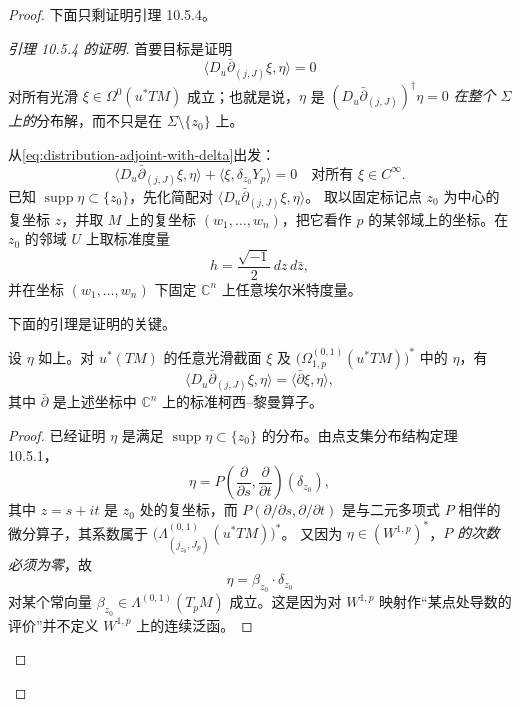 \begin{proof}
下面只剩证明引理 10.5.4。

\begin{proof}[引理 10.5.4 的证明]
首要目标是证明
\begin{equation}
 \langle D_u\bar\partial_{(j,J)}\xi,\eta\rangle=0
 \label{eq:global-distributional-adjoint-zero}
\end{equation}
对所有光滑 $\xi\in\Omega^0(u^*TM)$ 成立；也就是说，$\eta$ 是
$(D_u\bar\partial_{(j,J)})^\dagger\eta=0$ \emph{在整个 $\Sigma$ 上的}分布解，而不只是在
$\Sigma\setminus\{z_0\}$ 上。

从\eqref{eq:distribution-adjoint-with-delta}出发：
\begin{equation}
 \langle D_u\bar\partial_{(j,J)}\xi,\eta\rangle
 +\langle\xi,\delta_{z_0}Y_p\rangle=0
 \quad\text{对所有 }\xi\in C^\infty.
 \label{eq:distribution-adjoint-start}
\end{equation}
已知 $\operatorname{supp}\eta\subset\{z_0\}$，先化简配对
$\langle D_u\bar\partial_{(j,J)}\xi,\eta\rangle$。
取以固定标记点 $z_0$ 为中心的复坐标 $z$，并取 $M$ 上的复坐标
$(w_1,\ldots,w_n)$，把它看作 $p$ 的某邻域上的坐标。在 $z_0$ 的邻域
$U$ 上取标准度量
\[
 h=\frac{\sqrt{-1}}2\,dz\,d\bar z,
\]
并在坐标 $(w_1,\ldots,w_n)$ 下固定 $\mathbb C^n$ 上任意埃尔米特度量。

下面的引理是证明的关键。

\begin{lemma}\label{lem:local-standard-part-pairing}
设 $\eta$ 如上。对 $u^*(TM)$ 的任意光滑截面 $\xi$ 及
$\bigl(\Omega_{1,p}^{(0,1)}(u^*TM)\bigr)^*$ 中的 $\eta$，有
\[
 \langle D_u\bar\partial_{(j,J)}\xi,\eta\rangle
 =\langle\bar\partial\xi,\eta\rangle,
\]
其中 $\bar\partial$ 是上述坐标中 $\mathbb C^n$ 上的标准柯西--黎曼算子。
\end{lemma}

\begin{proof}
已经证明 $\eta$ 是满足
$\operatorname{supp}\eta\subset\{z_0\}$ 的分布。由点支集分布结构定理 10.5.1，
\[
 \eta=P\left(\frac\partial{\partial s},
 \frac\partial{\partial t}\right)(\delta_{z_0}),
\]
其中 $z=s+it$ 是 $z_0$ 处的复坐标，而
$P(\partial/\partial s,\partial/\partial t)$ 是与二元多项式 $P$ 相伴的微分算子，其系数属于
$\bigl(\Lambda_{(j_{z_0},J_p)}^{(0,1)}(u^*TM)\bigr)^*$。
又因为 $\eta\in(W^{1,p})^*$，\emph{$P$ 的次数必须为零}，故
\begin{equation}
 \eta=\beta_{z_0}\cdot\delta_{z_0}
 \label{eq:eta-delta-mass}
\end{equation}
对某个常向量
$\beta_{z_0}\in\Lambda^{(0,1)}(T_pM)$ 成立。这是因为对
$W^{1,p}$ 映射作“某点处导数的评价”并不定义 $W^{1,p}$ 上的连续泛函。


\end{proof}
\end{proof}
\end{proof}
